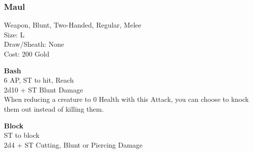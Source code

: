\subsubsection{Maul}\label{weapon:maul}
Weapon, Blunt, Two-Handed, Regular, Melee\\
Size: L\\
Draw/Sheath: None\\
Cost: 200 Gold

\textbf{Bash}\\
6 AP, ST to hit,  Reach\\
2d10 + ST Blunt Damage\\
When reducing a creature to 0 Health with this Attack, you can choose to knock them out instead of killing them.

\textbf{Block}\\
ST to block\\
2d4 + \texttimes ST Cutting, Blunt or Piercing Damage